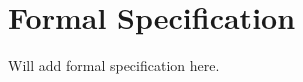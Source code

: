 \appendix
\renewcommand{\thechapter}{A}
\renewcommand{\chaptername}{Appendix}

\chapter{Formal Specification}
\label{apx:formal_specification}

Will add formal specification here.
